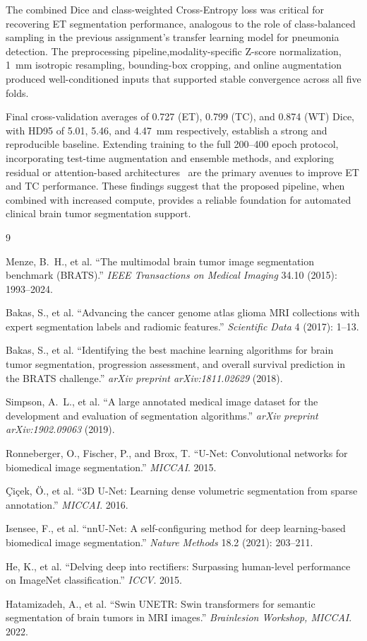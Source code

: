 \documentclass[10pt,twocolumn]{article}
\begin{document}
The combined Dice and class-weighted Cross-Entropy loss was
critical for recovering ET segmentation performance, analogous to
the role of class-balanced sampling in the previous assignment's
transfer learning model for pneumonia detection. The
preprocessing pipeline,modality-specific Z-score
normalization, 1~mm isotropic resampling, bounding-box cropping,
and online augmentation produced well-conditioned inputs that
supported stable convergence across all five folds.

Final cross-validation averages of 0.727 (ET), 0.799 (TC), and
0.874 (WT) Dice, with HD95 of 5.01, 5.46, and 4.47~mm
respectively, establish a strong and reproducible baseline.
Extending training to the full 200--400 epoch protocol,
incorporating test-time augmentation and ensemble methods, and
exploring residual or attention-based architectures~\cite{hatamizadeh2022}
are the primary avenues to improve ET and TC performance.
These findings suggest that the proposed pipeline, when combined
with increased compute, provides a reliable foundation for
automated clinical brain tumor segmentation support.

\begin{thebibliography}{9}

Menze, B.~H., et al. ``The multimodal brain tumor image
segmentation benchmark (BRATS).''
\textit{IEEE Transactions on Medical Imaging} 34.10 (2015):
1993--2024.

Bakas, S., et al. ``Advancing the cancer genome atlas glioma
MRI collections with expert segmentation labels and radiomic
features.'' \textit{Scientific Data} 4 (2017): 1--13.

Bakas, S., et al. ``Identifying the best machine learning
algorithms for brain tumor segmentation, progression
assessment, and overall survival prediction in the BRATS
challenge.'' \textit{arXiv preprint arXiv:1811.02629} (2018).

Simpson, A.~L., et al. ``A large annotated medical image
dataset for the development and evaluation of segmentation
algorithms.'' \textit{arXiv preprint arXiv:1902.09063} (2019).

Ronneberger, O., Fischer, P., and Brox, T. ``U-Net:
Convolutional networks for biomedical image segmentation.''
\textit{MICCAI}. 2015.

{\c{C}}i{\c{c}}ek, {\"O}., et al. ``3D U-Net: Learning dense
volumetric segmentation from sparse annotation.''
\textit{MICCAI}. 2016.

Isensee, F., et al. ``nnU-Net: A self-configuring method for
deep learning-based biomedical image segmentation.''
\textit{Nature Methods} 18.2 (2021): 203--211.

He, K., et al. ``Delving deep into rectifiers: Surpassing
human-level performance on ImageNet classification.''
\textit{ICCV}. 2015.

Hatamizadeh, A., et al. ``Swin UNETR: Swin transformers for
semantic segmentation of brain tumors in MRI images.''
\textit{Brainlesion Workshop, MICCAI}. 2022.

\end{thebibliography}
\end{document}
